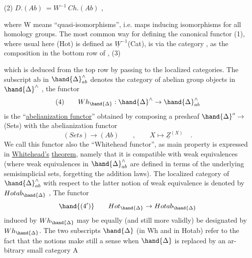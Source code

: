 
(2) \qquad $D.(Ab) \ = W^{-1}\ Ch.(Ab)$ \qquad ,

where W means ``quasi-isomorphisms'', i.e. maps inducing isomorphisms for
all homology groups. The most common way for defining the canonical
functor (1), where  usual here (Hot) is defined as $\underline{W}^{-1}$(Cat), is
via the  category \inserted{$\Delta$}, as the composition in the bottom row of
 \quad ,
(3)

which is deduced from the top row by passing to the localized categories.
The  subscript ab in $\hand{\Delta}^{\wedge}_{ab}$ denotes the category of abelian
group objects in $\hand{\Delta}^{\wedge}$ , the functor 
\[ (4) \qquad Wh_{\hand{\Delta}} : \hand{\Delta}^{\wedge} \to \hand{\Delta}^{\wedge}_{ab} \]
is the ``\uline{abelianization functor}'' obtained by composing a presheaf
$\hand{\Delta}^{o} \to$ (Sets) with the abelianization functor
\[ (Sets) \longrightarrow (Ab) \qquad , \qquad X \longmapsto \underline{Z}^{(X)} \quad . \]
We call this functor  also the ``Whitehead functor'', as  main property
 is expressed in \uline{Whitehead's} \uline{theorem}, namely that it
is compatible with weak equivalences (where weak equivalences in $\hand{\Delta}^{\wedge}_{ab}$
are defined in terms of the underlying semisimplicial sets, forgetting
the addition laws). The localized category of $\hand{\Delta}^{\wedge}_{ab}$ with respect to
the latter notion of weak equivalence is denoted by $Hotab_{\hand{\Delta}}$ , The
functor
\[ \hand{(4')} \qquad Hot_{\hand{\Delta}} \to Hotab_{\hand{\Delta}} \]
induced by $Wh_{\hand{\Delta}}$ may be equally (and still more validly) be designated
by $Wh_{\hand{\Delta}}$. The two subscripts $\hand{\Delta}$ (in Wh and in Hotab) refer to the
fact that the notions make still a sense when $\hand{\Delta}$ is replaced by an ar-%
bitrary small category A

